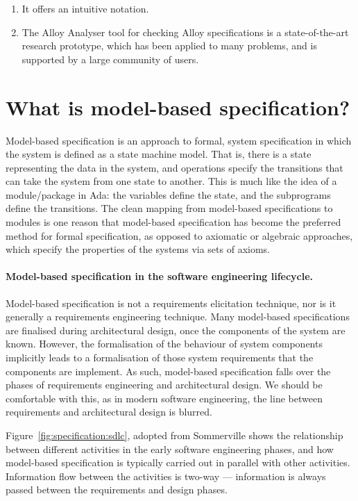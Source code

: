 \begin{enumerate}
 \item It offers an intuitive notation.
 \item The Alloy Analyser tool for checking Alloy specifications is a state-of-the-art research prototype, which has been applied to many problems, and is supported by a large community of users.
\end{enumerate}


\section{What is model-based specification?}

Model-based specification is an approach to formal, system specification in which the system is defined as a state machine model. That is, there is a state representing the data in the system, and operations specify the transitions that can take the system from one state to another. This is much like the idea of a module/package in Ada: the variables define the state, and the subprograms define the transitions. The clean mapping from model-based specifications to modules is one reason that model-based specification has become the preferred method for formal specification, as opposed to axiomatic or algebraic approaches, which specify the properties of the systems via sets of axioms.

\paragraph{Model-based specification in the software engineering lifecycle.}
Model-based specification is not a requirements elicitation technique, nor is it generally a requirements engineering technique. Many model-based specifications are finalised during architectural design, once the components of the system are known. However, the formalisation of the behaviour of system components implicitly leads to a formalisation of those system requirements that the components are implement. As such, model-based specification falls over the phases of requirements engineering and architectural design. We should be comfortable with this, as in modern software engineering, the line between requirements and architectural design is blurred.

Figure~\ref{fig:specification:sdlc}, adopted from Sommerville \cite[Ch.\ 27]{sommerville10} shows the relationship between different activities in the early software engineering phases, and how model-based specification is typically carried out in parallel with other activities. Information flow between the activities is two-way --- information is always passed between the requirements and design phases.

